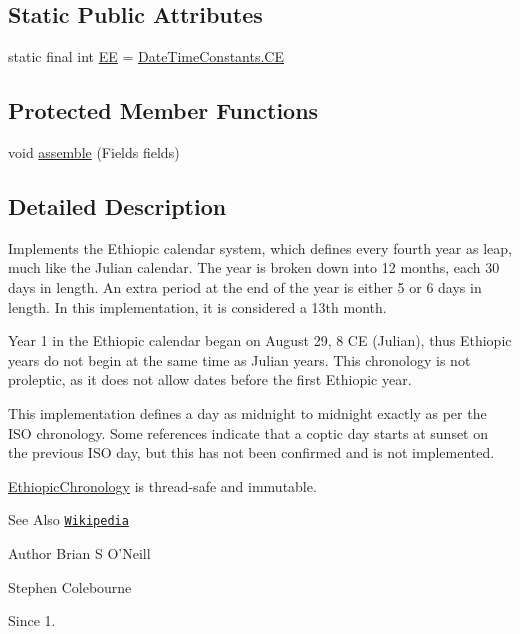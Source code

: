 \subsection*{Static Public Attributes}
\begin{DoxyCompactItemize}
\item 
static final int \hyperlink{classorg_1_1joda_1_1time_1_1chrono_1_1_ethiopic_chronology_a9da0d460869d1c459cf029942d8380d7}{E\-E} = \hyperlink{classorg_1_1joda_1_1time_1_1_date_time_constants_aacd9ad6e2964b143878d155f86db83bd}{Date\-Time\-Constants.\-C\-E}
\end{DoxyCompactItemize}
\subsection*{Protected Member Functions}
\begin{DoxyCompactItemize}
\item 
void \hyperlink{classorg_1_1joda_1_1time_1_1chrono_1_1_ethiopic_chronology_ae595da4f4d1e9f8347daa19bae08ae79}{assemble} (Fields fields)
\end{DoxyCompactItemize}


\subsection{Detailed Description}
Implements the Ethiopic calendar system, which defines every fourth year as leap, much like the Julian calendar. The year is broken down into 12 months, each 30 days in length. An extra period at the end of the year is either 5 or 6 days in length. In this implementation, it is considered a 13th month. 

Year 1 in the Ethiopic calendar began on August 29, 8 C\-E (Julian), thus Ethiopic years do not begin at the same time as Julian years. This chronology is not proleptic, as it does not allow dates before the first Ethiopic year. 

This implementation defines a day as midnight to midnight exactly as per the I\-S\-O chronology. Some references indicate that a coptic day starts at sunset on the previous I\-S\-O day, but this has not been confirmed and is not implemented. 

\hyperlink{classorg_1_1joda_1_1time_1_1chrono_1_1_ethiopic_chronology}{Ethiopic\-Chronology} is thread-\/safe and immutable.

\begin{DoxySeeAlso}{See Also}
\href{http://en.wikipedia.org/wiki/Ethiopian_calendar}{\tt Wikipedia}
\end{DoxySeeAlso}
\begin{DoxyAuthor}{Author}
Brian S O'Neill 

Stephen Colebourne 
\end{DoxyAuthor}
\begin{DoxySince}{Since}
1. 
\end{DoxySince}


